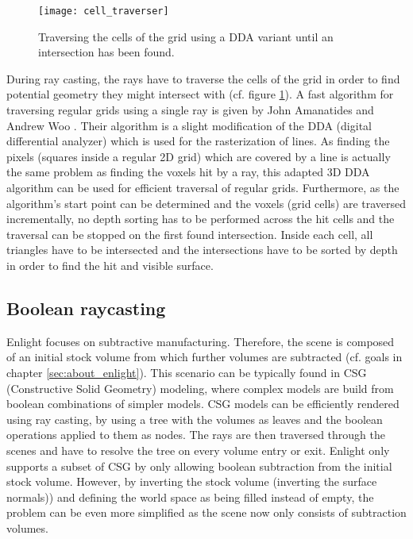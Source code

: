 \begin{figure}
\centering
\texttt{[image: cell\_traverser]}
\caption{Traversing the cells of the grid using a DDA variant until an intersection has been found.}
\label{fig:cell_traverser}
\end{figure}

During ray casting, the rays have to traverse the cells of the grid in order to find potential geometry they might intersect with (cf. figure \ref{fig:cell_traverser}). A fast algorithm for traversing regular grids using a single ray is given by John Amanatides and Andrew Woo \cite{3DDDA}. Their algorithm is a slight modification of the DDA (digital differential analyzer) which is used for the rasterization of lines. As finding the pixels (squares inside a regular 2D grid) which are covered by a line is actually the same problem as finding the voxels hit by a ray, this adapted 3D DDA algorithm can be used for efficient traversal of regular grids. Furthermore, as the algorithm's start point can be determined and the voxels (grid cells) are traversed incrementally, no depth sorting has to be performed across the hit cells and the traversal can be stopped on the first found intersection. Inside each cell, all triangles have to be intersected and the intersections have to be sorted by depth in order to find the hit and visible surface.


\subsection{Boolean raycasting}

Enlight focuses on subtractive manufacturing. Therefore, the scene is composed of an initial stock volume from which further volumes are subtracted (cf. goals in chapter \ref{sec:about_enlight}). This scenario can be typically found in CSG (Constructive Solid Geometry) modeling, where complex models are build from boolean combinations of simpler models. CSG models can be efficiently rendered using ray casting, by using a tree with the volumes as leaves and the boolean operations applied to them as nodes. The rays are then traversed through the scenes and have to resolve the tree on every volume entry or exit. Enlight only supports a subset of CSG by only allowing boolean subtraction from the initial stock volume. However, by inverting the stock volume (inverting the surface normals)) and defining the world space as being filled instead of empty, the problem can be even more simplified as the scene now only consists of subtraction volumes.

